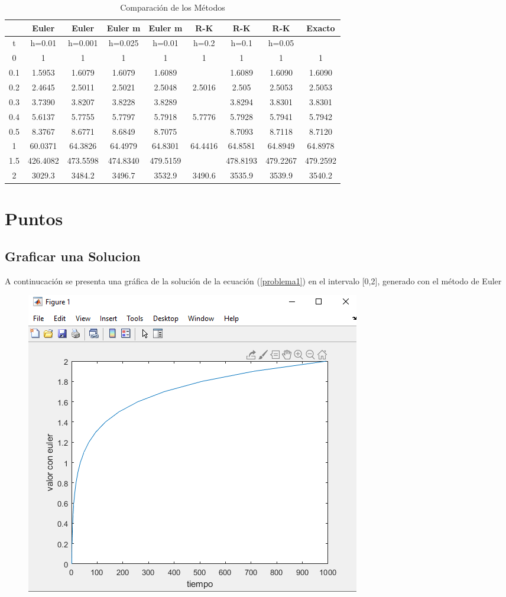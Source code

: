 \documentclass[12pt]{article}
\begin{document}
\begin{table}[h]
	\centering
	\begin{tabular}{|c|c|c|c|c|c|c|c|c|}
		\hline
		&Euler&Euler&Euler m&Euler m&R-K&R-K&R-K&Exacto\\
		\hline
		t & h=0.01 & h=0.001 & h=0.025 & h=0.01 & h=0.2 & h=0.1 & h=0.05 &\\
		\hline
		0&1&1&1&1&1&1&1&1\\
		\hline
		0.1&1.5953&1.6079&1.6079&1.6089&&1.6089&1.6090&1.6090\\
		\hline
		0.2&2.4645&2.5011&2.5021&2.5048&2.5016&2.505&2.5053&2.5053\\
		\hline
		0.3&3.7390&3.8207&3.8228&3.8289&&3.8294&3.8301&3.8301\\
		\hline
		0.4&5.6137&5.7755&5.7797&5.7918&5.7776&5.7928&5.7941&5.7942\\
		\hline
		0.5&8.3767&8.6771&8.6849&8.7075&&8.7093&8.7118&8.7120\\
		\hline
		1&60.0371&64.3826&64.4979&64.8301&64.4416&64.8581&64.8949&64.8978\\
		\hline
		1.5&426.4082&473.5598&474.8340&479.5159&&478.8193&479.2267&479.2592\\
		\hline
		2&3029.3&3484.2&3496.7&3532.9&3490.6&3535.9&3539.9&3540.2\\
		\hline
	\end{tabular}
	\caption{Comparación de los Métodos}
	\label{table1}
\end{table}
\newpage
\section{Puntos}
\subsection{Graficar una Solucion}
A continucación se presenta una gráfica de la solución de la ecuación  (\ref{problema1}) en el intervalo [0,2], generado con el método de Euler
\begin{figure}[h]
	\centering
	\caption{}
	\includegraphics[scale=0.3]{graf1.png}
	\label{graf1}
\end{figure}
\end{document}
